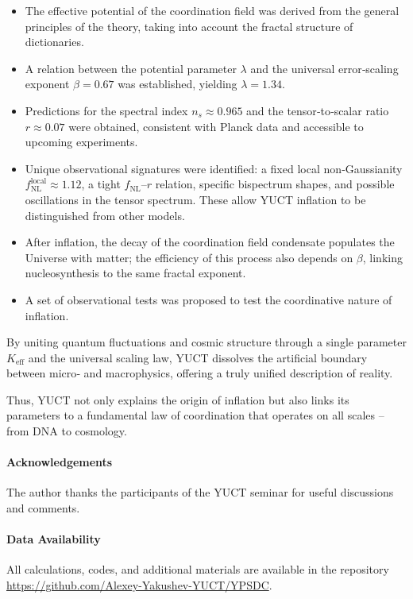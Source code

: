 \documentclass[12pt]{article}
\theoremstyle{remark}
\begin{document}
	\begin{itemize}
		\item The effective potential of the coordination field was derived from the general principles of the theory, taking into account the fractal structure of dictionaries.
		\item A relation between the potential parameter $\lambda$ and the universal error‑scaling exponent $\beta = 0.67$ was established, yielding $\lambda = 1.34$.
		\item Predictions for the spectral index $n_s \approx 0.965$ and the tensor‑to‑scalar ratio $r \approx 0.07$ were obtained, consistent with Planck data and accessible to upcoming experiments.
		\item Unique observational signatures were identified: a fixed local non‑Gaussianity $f_{\text{NL}}^{\text{local}} \approx 1.12$, a tight $f_{\text{NL}}$–$r$ relation, specific bispectrum shapes, and possible oscillations in the tensor spectrum. These allow YUCT inflation to be distinguished from other models.
		\item After inflation, the decay of the coordination field condensate populates the Universe with matter; the efficiency of this process also depends on $\beta$, linking nucleosynthesis to the same fractal exponent.
		\item A set of observational tests was proposed to test the coordinative nature of inflation.
	\end{itemize}
	
	By uniting quantum fluctuations and cosmic structure through a single parameter $K_{\mathrm{eff}}$ and the universal scaling law, YUCT dissolves the artificial boundary between micro‑ and macrophysics, offering a truly unified description of reality.
	
	Thus, YUCT not only explains the origin of inflation but also links its parameters to a fundamental law of coordination that operates on all scales – from DNA to cosmology.
	
	\paragraph*{Acknowledgements}
	The author thanks the participants of the YUCT seminar for useful discussions and comments.
	
	\paragraph*{Data Availability}
	All calculations, codes, and additional materials are available in the repository \url{https://github.com/Alexey-Yakushev-YUCT/YPSDC}.
	
\end{document}
